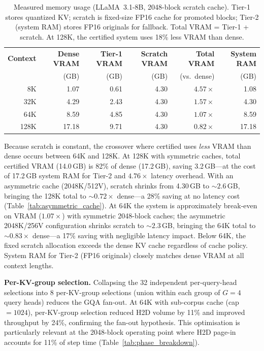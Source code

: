 \documentclass[10pt,twocolumn,a4paper]{article}
\theoremstyle{definition}
\theoremstyle{remark}
\begin{document}
\begin{table}[!t]
\centering
\caption{Measured memory usage (LLaMA~3.1-8B, 2048-block scratch cache).  Tier-1 stores quantized KV; scratch is fixed-size FP16 cache for promoted blocks; Tier-2 (system RAM) stores FP16 originals for fallback.  Total VRAM = Tier-1 + scratch.  At 128K, the certified system uses 18\% less VRAM than dense.}
\label{tab:memory}
\small
\begin{tabular}{rrrrrr}
\toprule
\textbf{Context} & \textbf{Dense VRAM} & \textbf{Tier-1 VRAM} & \textbf{Scratch VRAM} & \textbf{Total VRAM} & \textbf{System RAM} \\
 & (GB) & (GB) & (GB) & (vs.\ dense) & (GB) \\
\midrule
8K   & 1.07 & 0.61 & 4.30 & $4.57\times$ & 1.08 \\
32K  & 4.29 & 2.43 & 4.30 & $1.57\times$ & 4.30 \\
64K  & 8.59 & 4.85 & 4.30 & $1.07\times$ & 8.59 \\
\rowcolor[gray]{0.92}
128K & 17.18 & 9.71 & 4.30 & $0.82\times$ & 17.18 \\
\bottomrule
\end{tabular}
\end{table}

Because scratch is constant, the crossover where certified uses \emph{less} VRAM than dense occurs between 64K and 128K.  At 128K with symmetric caches, total certified VRAM (14.0\,GB) is 82\% of dense (17.2\,GB), saving 3.2\,GB---at the cost of 17.2\,GB system RAM for Tier-2 and $4.76\times$ latency overhead.  With an asymmetric cache (2048K/512V), scratch shrinks from 4.30\,GB to ${\sim}2.6$\,GB, bringing the 128K total to ${\sim}0.72\times$ dense---a 28\% saving at no latency cost (Table~\ref{tab:asymmetric_cache}).  At 64K the system is approximately break-even on VRAM ($1.07\times$) with symmetric 2048-block caches; the asymmetric 2048K/256V configuration shrinks scratch to ${\sim}2.3$\,GB, bringing the 64K total to ${\sim}0.83\times$ dense---a 17\% saving with negligible latency impact.  Below 64K, the fixed scratch allocation exceeds the dense KV cache regardless of cache policy.  System RAM for Tier-2 (FP16 originals) closely matches dense VRAM at all context lengths.

\textbf{Per-KV-group selection.}  Collapsing the 32 independent per-query-head selections into 8 per-KV-group selections (union within each group of $G{=}4$ query heads) reduces the GQA fan-out.  At 64K with sub-corpus cache (cap${}=1024$), per-KV-group selection reduced H2D volume by 11\% and improved throughput by 24\%, confirming the fan-out hypothesis.  This optimisation is particularly relevant at the 2048-block operating point where H2D page-in accounts for 11\% of step time (Table~\ref{tab:phase_breakdown}).
\end{document}
